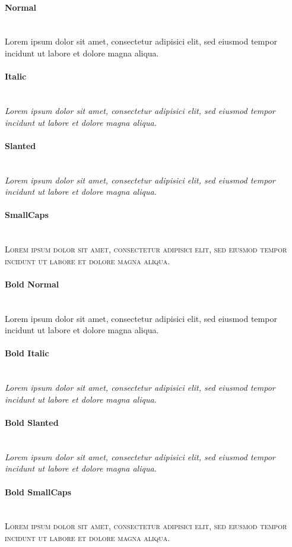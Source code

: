 {\sffamily
\paragraph{Normal}\hfill\\
{
Lorem ipsum dolor sit amet, consectetur adipisici elit, sed eiusmod tempor
incidunt ut labore et dolore magna aliqua.}
\paragraph{Italic}\hfill\\
{\itshape
Lorem ipsum dolor sit amet, consectetur adipisici elit, sed eiusmod tempor
incidunt ut labore et dolore magna aliqua.}
\paragraph{Slanted}\hfill\\
{\slshape
Lorem ipsum dolor sit amet, consectetur adipisici elit, sed eiusmod tempor
incidunt ut labore et dolore magna aliqua.}
\paragraph{SmallCaps}\hfill\\
{\scshape
Lorem ipsum dolor sit amet, consectetur adipisici elit, sed eiusmod tempor
incidunt ut labore et dolore magna aliqua.}

{\bfseries
\paragraph{Bold Normal}\hfill\\
{
Lorem ipsum dolor sit amet, consectetur adipisici elit, sed eiusmod tempor
incidunt ut labore et dolore magna aliqua.}
\paragraph{Bold Italic}\hfill\\
{\itshape
Lorem ipsum dolor sit amet, consectetur adipisici elit, sed eiusmod tempor
incidunt ut labore et dolore magna aliqua.}
\paragraph{Bold Slanted}\hfill\\
{\slshape
Lorem ipsum dolor sit amet, consectetur adipisici elit, sed eiusmod tempor
incidunt ut labore et dolore magna aliqua.}
\paragraph{Bold SmallCaps}\hfill\\
{\scshape
Lorem ipsum dolor sit amet, consectetur adipisici elit, sed eiusmod tempor
incidunt ut labore et dolore magna aliqua.}
}
}

